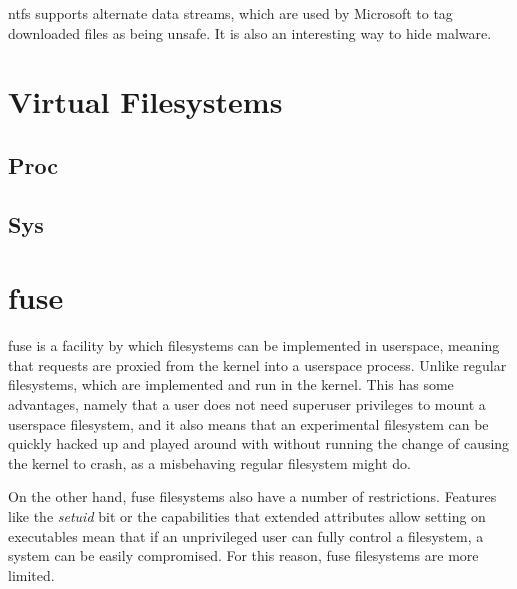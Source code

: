 \documentclass[a4paper]{article}
\begin{document}

\gls{ntfs} supports alternate data streams, which are used by Microsoft to tag downloaded files as being unsafe. It is also an interesting way to hide malware.

\section{Virtual Filesystems}

\subsection{Proc}

\subsection{Sys}

\section{\glsdesc*{fuse}}

\gls{fuse} is a facility by which filesystems can be implemented in userspace, meaning that requests are proxied from the kernel into a userspace process. Unlike regular filesystems, which are implemented and run in the kernel. This has some advantages, namely that a user does not need superuser privileges to mount a userspace filesystem, and it also means that an experimental filesystem can be quickly hacked up and played around with without running the change of causing the kernel to crash, as a misbehaving regular filesystem might do. 

On the other hand, \gls{fuse} filesystems also have a number of restrictions. Features like the \emph{setuid} bit or the capabilities that extended attributes allow setting on executables mean that if an unprivileged user can fully control a filesystem, a system can be easily compromised. For this reason, \gls{fuse} filesystems are more limited.


\printglossaries
\end{document}
